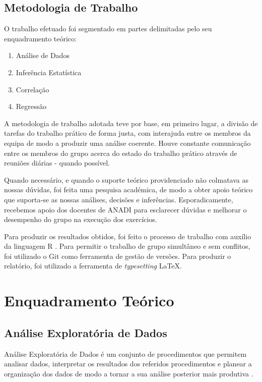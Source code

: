 \documentclass[conference]{IEEEtran}
\begin{document}
\subsection{Metodologia de Trabalho}

O trabalho efetuado foi segmentado em partes delimitadas pelo seu enquadramento teórico:

\begin{enumerate}
\item Análise de Dados
\item Inferência Estatística
\item Correlação 
\item Regressão
\end{enumerate}

A metodologia de trabalho adotada teve por base, em primeiro lugar, a divisão de tarefas do trabalho prático de forma justa, com interajuda entre os membros da equipa de modo a produzir uma análise coerente. Houve constante comunicação entre os membros do grupo acerca do estado do trabalho prático através de reuniões diárias - quando possível. 

Quando necessário, e quando o suporte teórico providenciado não colmatava as nossas dúvidas, foi feita uma pesquisa académica, de modo a obter apoio teórico que suporta-se as nossas análises, decisões e inferências. Esporadicamente, recebemos apoio dos docentes de ANADI para esclarecer dúvidas e melhorar o desempenho do grupo na execução dos exercícios. 

Para produzir os resultados obtidos, foi feito o processo de trabalho com auxílio da linguagem R \cite{rlang}. Para permitir o trabalho de grupo simultâneo e sem conflitos, foi utilizado o Git \cite{trovalds} como ferramenta de gestão de versões. Para produzir o relatório, foi utilizado a ferramenta de \textit{typesetting} \LaTeX.


\section{Enquadramento Teórico}

\subsection{Análise Exploratória de Dados}

Análise Exploratória de Dados é um conjunto de procedimentos que permitem analisar dados, interpretar os resultados dos referidos procedimentos e planear a organização dos dados de modo a tornar a sua análise posterior mais produtiva \cite{Tukey_1962}.
\end{document}
